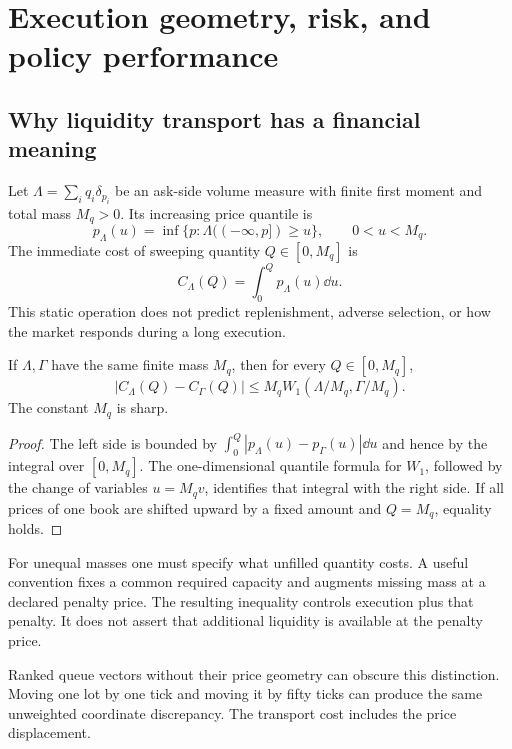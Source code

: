 \section{Execution geometry, risk, and policy performance}\label{sec:execution}
\subsection{Why liquidity transport has a financial meaning}
Let $\Lambda=\sum_iq_i\delta_{p_i}$ be an ask-side volume measure with finite first moment and total mass $M_q>0$. Its increasing price quantile is
\[
 p_\Lambda(u)=\inf\{p:\Lambda((-\infty,p])\ge u\},
 \qquad 0<u<M_q.
\]
The immediate cost of sweeping quantity $Q\in[0,M_q]$ is
\begin{equation}\label{eq:sweep}
 C_\Lambda(Q)=\int_0^Qp_\Lambda(u)\dd u.
\end{equation}
This static operation does not predict replenishment, adverse selection, or how the market responds during a long execution.

\begin{theorem}\label{thm:sweep}
If $\Lambda,\Gamma$ have the same finite mass $M_q$, then for every $Q\in[0,M_q]$,
\begin{equation}\label{eq:sweep-bound}
 |C_\Lambda(Q)-C_\Gamma(Q)|
 \le M_qW_1(\Lambda/M_q,\Gamma/M_q).
\end{equation}
The constant $M_q$ is sharp.
\end{theorem}
\begin{proof}
The left side is bounded by
$\int_0^Q|p_\Lambda(u)-p_\Gamma(u)|\dd u$ and hence by the integral over $[0,M_q]$. The one-dimensional quantile formula for $W_1$, followed by the change of variables $u=M_qv$, identifies that integral with the right side. If all prices of one book are shifted upward by a fixed amount and $Q=M_q$, equality holds.
\end{proof}

For unequal masses one must specify what unfilled quantity costs. A useful convention fixes a common required capacity and augments missing mass at a declared penalty price. The resulting inequality controls execution plus that penalty. It does not assert that additional liquidity is available at the penalty price.

Ranked queue vectors without their price geometry can obscure this distinction. Moving one lot by one tick and moving it by fifty ticks can produce the same unweighted coordinate discrepancy. The transport cost includes the price displacement.

